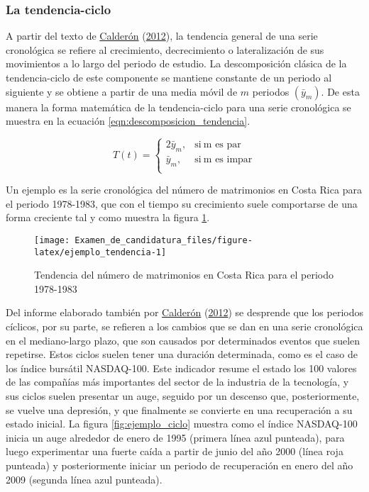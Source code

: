 \documentclass[
]{article}
\begin{document}
\subsubsection{La tendencia-ciclo}

A partir del texto de
\protect\hyperlink{ref-calderon2012estadistica}{Calderón}
(\protect\hyperlink{ref-calderon2012estadistica}{2012}), la tendencia
general de una serie cronológica se refiere al crecimiento,
decrecimiento o lateralización de sus movimientos a lo largo del periodo
de estudio. La descomposición clásica de la tendencia-ciclo de este
componente se mantiene constante de un periodo al siguiente y se obtiene
a partir de una media móvil de \(m\) periodos
\(\left(\bar y_{m}\right)\). De esta manera la forma matemática de la
tendencia-ciclo para una serie cronológica se muestra en la ecuación
\ref{eqn:descomposicion_tendencia}.

\begin{equation}
\label{eqn:descomposicion_tendencia}
T(t)=
\begin{cases}
2\bar y_{m}, & \text{si}\ \text{m es par} \\
\bar y_{m}, & \text{si}\ \text{m es impar} \\
\end{cases}
\end{equation}

Un ejemplo es la serie cronológica del número de matrimonios en Costa
Rica para el periodo 1978-1983, que con el tiempo su crecimiento suele
comportarse de una forma creciente tal y como muestra la figura
\ref{fig:ejemplo_tendencia}.

\begin{figure}[H]
\texttt{[image: Examen\_de\_candidatura\_files/figure-latex/ejemplo\_tendencia-1]} \caption{Tendencia del número de matrimonios en Costa Rica para el periodo 1978-1983}\label{fig:ejemplo_tendencia}
\end{figure}

Del informe elaborado también por
\protect\hyperlink{ref-calderon2012estadistica}{Calderón}
(\protect\hyperlink{ref-calderon2012estadistica}{2012}) se desprende que
los periodos cíclicos, por su parte, se refieren a los cambios que se
dan en una serie cronológica en el mediano-largo plazo, que son causados
por determinados eventos que suelen repetirse. Estos ciclos suelen tener
una duración determinada, como es el caso de los índice bursátil
NASDAQ-100. Este indicador resume el estado los 100 valores de las
compañías más importantes del sector de la industria de la tecnología, y
sus ciclos suelen presentar un auge, seguido por un descenso que,
posteriormente, se vuelve una depresión, y que finalmente se convierte
en una recuperación a su estado inicial. La figura
\ref{fig:ejemplo_ciclo} muestra como el índice NASDAQ-100 inicia un auge
alrededor de enero de 1995 (primera línea azul punteada), para luego
experimentar una fuerte caída a partir de junio del año 2000 (línea roja
punteada) y posteriormente iniciar un periodo de recuperación en enero
del año 2009 (segunda línea azul punteada).
\end{document}
